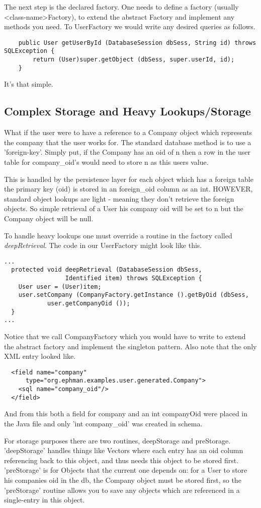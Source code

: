\documentclass[10pt,openany]{book}
\begin{document}
The next step is the declared factory.  One needs to define a factory
(usually \textless class-name\textgreater Factory), to extend the
abstract Factory and implement any methods you need.  To UserFactory
we would write any desired queries as follows.
\begin{verbatim}
	public User getUserById (DatabaseSession dbSess, String id) throws
SQLException {
		return (User)super.getObject (dbSess, super.userId, id);
	}
\end{verbatim}
It's that simple.
\subsection{Complex Storage and Heavy Lookups/Storage}
What if the user were to have a reference to a Company object which
represents the company that the user works for.  The standard database
method is to use a 'foreign-key'.  Simply put, if the Company has an
oid of n then a row in the user table for company\_oid's would need to
store n as this users value.


This is handled by the persistence layer for each object which has a
foreign table the primary key (oid) is stored in an
foreign\_oid column as an int.  HOWEVER, standard object lookups are
light - meaning they don't retrieve the foreign objects.  So simple
retrieval of a User his company oid will be set to n but the Company
object will be null.

To handle heavy lookups one must override a routine in the factory
called \emph{deepRetrieval}.  The code in our UserFactory might look
like this.
\begin{verbatim}
...
  protected void deepRetrieval (DatabaseSession dbSess,
                 Identified item) throws SQLException {
    User user = (User)item;
    user.setCompany (CompanyFactory.getInstance ().getByOid (dbSess,
            user.getCompanyOid ());
  }
...
\end{verbatim}
Notice that we call CompanyFactory which you would have to write to extend
the abstract factory and implement the singleton pattern.  Also
note that the only XML entry looked like.
\begin{verbatim}
  <field name="company"
      type="org.ephman.examples.user.generated.Company">
    <sql name="company_oid"/>
  </field>
\end{verbatim}
And from this both a field for company and an int companyOid were placed
in the Java file and only 'int company\_oid' was created in schema.


For storage purposes there are two routines, deepStorage and
preStorage.  'deepStorage' handles things like Vectors where each
entry has an oid column referencing back to this object, and thus
needs this object to be stored first.  'preStorage' is for Objects
that the current one depends on: for a User to store his companies oid in
the db, the Company object must be stored first, so the 'preStorage'
routine allows you to save any objects which are referenced in a
single-entry in this object.
\end{document}
